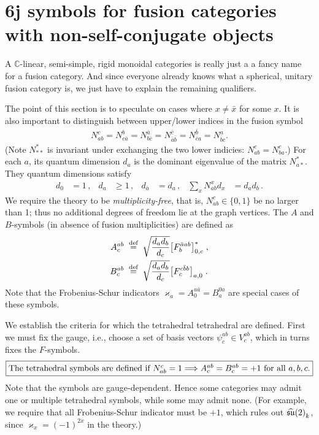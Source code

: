 \section{6j symbols for fusion categories with non-self-conjugate objects}
\label{app:notselfdual}

A $\mathbb{C}$-linear, semi-simple, rigid monoidal categories is really just a a fancy name for a fusion category.
And since everyone already knows what a spherical, unitary fusion category is, we just have to explain the remaining qualifiers.

The point of this section is to speculate on cases where $x \neq \bar{x}$ for some $x$.
It is also important to distinguish between upper/lower indices in the fusion symbol
\begin{align}
	N^{c}_{ab} = N^{b}_{c\bar{a}} = N^{\bar{a}}_{b\bar{c}} = N^{\bar{c}}_{\bar{a}\bar{b}} = N^{\bar{b}}_{\bar{c}a} = N^{a}_{\bar{b}c} .
\end{align}
(Note $N^\ast_{\ast\ast}$ is invariant under exchanging the two lower indicies: $N^c_{ab} = N^c_{ba}$.)
For each $a$, its quantum dimension $d_a$ is the dominant eigenvalue of the matrix $N^\ast_{a\ast}$.
They quantum dimensions satisfy
\begin{align}
	d_0 &= 1 \,,
&	d_a &\geq 1 \,,
&	d_{\bar{a}} &= d_a \,,
&	\sum_x N^x_{ab} d_x &= d_a d_b \,.
\end{align}
We require the theory to be \emph{multiplicity-free}, that is, $N^c_{ab} \in \{0, 1\}$ be no larger than 1; thus no additional degrees of freedom lie at the graph vertices.
The $A$ and $B$-symbols (in absence of fusion multiplicities) are defined as
\begin{subequations}\begin{align}
	A^{ab}_c & \;\mathrel{\overset{\textrm{def}}{=}}\; \sqrt{\frac{d_ad_b}{d_c}} \big[ F_b^{\bar{a}ab} \big]^\ast_{0,c} \;,
\\	B^{ab}_c & \;\mathrel{\overset{\textrm{def}}{=}}\; \sqrt{\frac{d_ad_b}{d_c}} \big[ F_c^{c\bar{b}b} \big]_{a,0} \;.
\end{align}\end{subequations}
Note that the Frobenius-Schur indicators $\varkappa_a = A_0^{a\bar{a}} = B_a^{0a}$ are special cases of these symbols.

We establish the criteria for which the tetrahedral tetrahedral are defined.
First we must fix the gauge, i.e., choose a set of basis vectors $\psi_c^{ab} \in V_c^{ab}$, which in turns fixes the $F$-symbols.
\begin{align}
	\fbox{\text{The tetrahedral symbols are defined if $N_{ab}^c = 1 \Longrightarrow A_c^{ab} = B_c^{ab} = +1$ for all $a,b,c$.}}
\end{align}
Note that the symbols are gauge-dependent.  Hence some categories may admit one or multiple tetrahedral symbols, while some may admit none.
(For example, we require that all Frobenius-Schur indicator must be $+1$, which rules out ${\widehat{\mathfrak{su}}(2)}_k$, since $\varkappa_x = (-1)^{2x}$ in the theory.)



